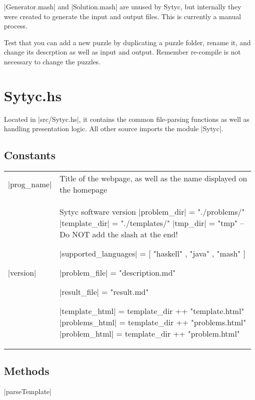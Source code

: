 \documentclass[a4paper]{article}
\begin{document}
|Generator.mash| and |Solution.mash| are unused by Sytyc, but internally they were created to generate the input and output files.  This is currently a manual process.

Test that you can add a new puzzle by duplicating a puzzle folder, rename it, and change its descrption as well as input and output.  Remember re-compile is not necessary to change the puzzles.
\pagebreak
\section{Sytyc.hs}
Located in |src/Sytyc.hs|, it contains the common file-parsing functions as well as handling presentation logic.  All other source imports the module |Sytyc|.

\subsection{Constants}
\begin{tabular}{ l l }
|prog_name| & Title of the webpage, as well as the name displayed on the homepage \\
|version| & Sytyc software version
|problem_dir| = "./problems/"
|template_dir| = "./templates/"
|tmp_dir| = "tmp" -- Do NOT add the slash at the end!

|supported_languages| = [ "haskell"
                      , "java"
                      , "mash"
                      ]
                      
|problem_file| = "description.md"
                      
|result_file| = "result.md"

|template_html| = template_dir ++ "template.html"
|problems_html| = template_dir ++ "problems.html"
|problem_html| = template_dir ++ "problem.html"
\end{tabular}

\subsection{Methods}

|parseTemplate|
\end{document}
